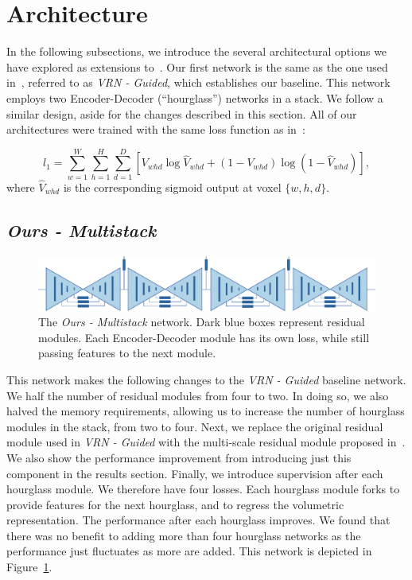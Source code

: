 \section{Architecture}

In the following subsections, we introduce the several architectural
options we have explored as extensions to~\cite{jackson2017vrn}. Our
first network is the same as the one used in~\cite{jackson2017vrn}, referred
to as \textit{VRN - Guided}, which establishes our baseline. This
network employs two Encoder-Decoder (``hourglass'') networks in a
stack. We follow a similar design, aside for the changes described in
this section. All of our architectures were trained with the same loss
function as in~\cite{jackson2017vrn}:

\begin{equation}
  l_{1} = \sum\limits_{w=1}^{W} \sum\limits_{h=1}^{H}\sum\limits_{d=1}^{D}[V_{whd}\log \widehat{V}_{whd}+(1-V_{whd})\log(1-\widehat{V}
_{whd})],
\end{equation}
where $\widehat{V}_{whd}$ is the corresponding sigmoid output at voxel
$\{w,h,d\}$.

\subsection{\textit{Ours - Multistack}}

\begin{figure}
  \includegraphics[width=\linewidth]{img/multistack.pdf}
  \caption[Proposed stacked architecture]{The \textit{Ours -
      Multistack} network. Dark blue boxes represent residual
    modules. Each Encoder-Decoder module has its own loss, while still
    passing features to the next module.}
  \label{fig:multistack}
\end{figure}


This network makes the following changes to the \textit{VRN - Guided}
baseline network. We half the number of residual modules from four to
two. In doing so, we also halved the memory requirements, allowing us
to increase the number of hourglass modules in the stack, from two to
four. Next, we replace the original residual module used in
\textit{VRN - Guided} with the multi-scale residual module proposed
in~\cite{bulat2017binarized}. We also show the performance improvement
from introducing just this component in the results section. Finally,
we introduce supervision after each hourglass module. We therefore
have four losses. Each hourglass module forks to provide features for
the next hourglass, and to regress the volumetric representation. The
performance after each hourglass improves. We found that there was no
benefit to adding more than four hourglass networks as the performance
just fluctuates as more are added. This network is depicted in
Figure~\ref{fig:multistack}.

